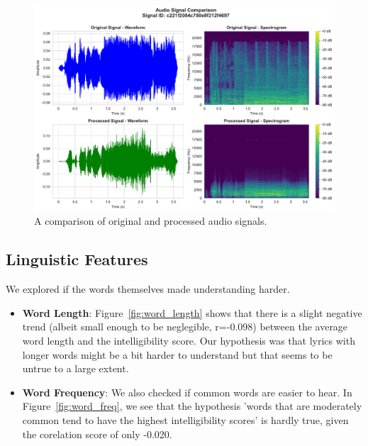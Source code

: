 \documentclass[conference]{IEEEtran}
\begin{document}
\begin{figure}[htbp]
    \centering
    \includegraphics[width=\columnwidth]{plots/figure_2_signal_comparison.pdf}
    \caption{A comparison of original and processed audio signals.}
    \label{fig:signal_comp}
\end{figure}

\subsection{Linguistic Features}
We explored if the words themselves made understanding harder.
\begin{itemize}
    \item \textbf{Word Length}: Figure~\ref{fig:word_length} shows that there is a slight negative trend (albeit small enough to be neglegible, r=-0.098) between the average word length and the intelligibility score. Our hypothesis was that lyrics with longer words might be a bit harder to understand but that seems to be untrue to a large extent.
    \item \textbf{Word Frequency}: We also checked if common words are easier to hear. In Figure~\ref{fig:word_freq}, we see that the hypothesis 'words that are moderately common tend to have the highest intelligibility scores' is hardly true, given the corelation score of only -0.020. 
\end{itemize}
\end{document}
